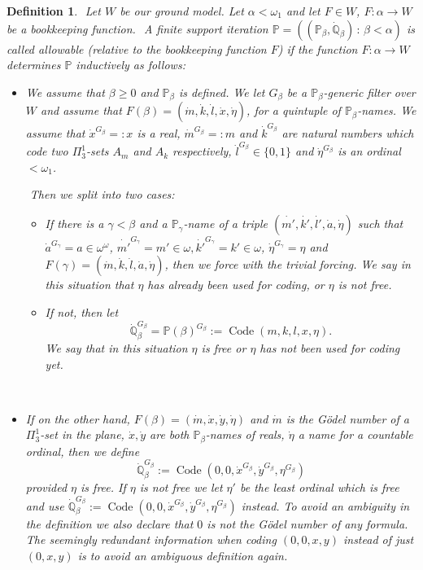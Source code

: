 \documentclass[a4paper,11pt]{article}
\newtheorem{definition}[theorem]{Definition}
\newcommand{\forceP}{\mathbb{P}}
\newcommand{\forceQ}{\mathbb{Q}}
\begin{document}
    \begin{definition}\label{0-allowable forcing}
    ﻿
    Let $W$ be our ground model. Let $\alpha < \omega_1$ and let $F\in W$, $F: \alpha \rightarrow W$ be a bookkeeping function.
    ﻿
    A finite support iteration $\forceP=((\forceP_{\beta}, \dot{\forceQ}_{\beta})  \,:\, {\beta< \alpha})$ is called allowable (relative to the bookkeeping function $F$)  if the function $F: \alpha \rightarrow W$  determines $\forceP$ inductively as follows:
    ﻿
     \begin{itemize}
    ﻿
     \item[(1)] We assume that $\beta \ge 0$ and $\forceP_{\beta}$ is defined. We let $G_{\beta}$ be a $\forceP_{\beta}$-generic filter over $W$ and assume that $F(\beta)=(\dot{m},\dot{k}, \dot{l}, \dot{x},\dot{\eta})$, for a quintuple of $\forceP_{\beta}$-names. We assume that $\dot{x}^{G_{\beta}}=:x$ is a real, $\dot{m}^{G_{\beta}}=:m $ and $\dot{k}^{G_{\beta}}$ are natural numbers which code two $\Pi^1_3$-sets $A_m$ and $A_k$ respectively, $\dot{l}^{G_{\beta}} \in \{0,1\}$ and $\dot{\eta}^{G_{\beta}}$ is an ordinal $< \omega_1$. 
    ﻿
     
    ﻿
     Then we split into two cases:
    ﻿
     \begin{itemize}
    ﻿
     \item If there is a $\gamma< \beta$ and a $\forceP_{\gamma}$-name of a triple $( \dot{m'}, \dot{k'}, \dot{l'} ,\dot{a},\dot{\eta}) $ such that $\dot{a}^{G_{\gamma}}= a \in \omega^{\omega}$, $\dot{m'}^{G_{\gamma}}= m' \in \omega ,\dot{k'}^{G_{\gamma}}=k' \in \omega$, $\dot{\eta}^{G_{\gamma}} = \eta$  and
     $F(\gamma)= ( \dot{m}, \dot{k}, \dot{l} ,\dot{a},\dot{\eta}) $, then we force with the trivial forcing. We say in this situation that $\eta$ has already been used for coding, or $\eta$ is not free.
    ﻿
     \item If not, then let \[\dot{\forceQ}_{\beta}^{G_{\beta}}=\forceP(\beta)^{G_{\beta}}:= \operatorname{Code} (m,k,l,x,\eta) .\] We say that in this situation $\eta$ is free or $\eta$ has not been used for coding yet.
    ﻿
     \end{itemize}
    ﻿
     \item[(2)] If on the other hand, $F(\beta) = (\dot{m},\dot{x}, \dot{y}, \dot{\eta})$ and $\dot{m}$ is the G\"odel number of a $\Pi^1_3$-set in the plane, $\dot{x},\dot{y}$ are both $\forceP_{\beta}$-names of reals, $\dot{\eta}$ a name for a countable ordinal, then we define
    \[ \dot{\forceQ}_{\beta}^{G_{\beta}} := \operatorname{Code} (0,0,\dot{x}^{G_{\beta}}, \dot{y}^{G_{\beta}}, \eta^{G_{\beta}}) \]
    provided $\eta$ is free. If $\eta$ is not free we let $\eta'$ be the least ordinal which is free and use $ \dot{\forceQ}_{\beta}^{G_{\beta}} :=\operatorname{Code} (0,0,\dot{x}^{G_{\beta}}, \dot{y}^{G_{\beta}}, \eta^{G_{\beta}})$ instead. To avoid an ambiguity in the definition we also declare that $0$ is not the G\"odel number of any formula. The seemingly redundant information when coding $(0,0,x,y)$ instead of just $(0,x,y)$ is to avoid an ambiguous definition again.


\end{itemize}
\end{definition}
\end{document}
